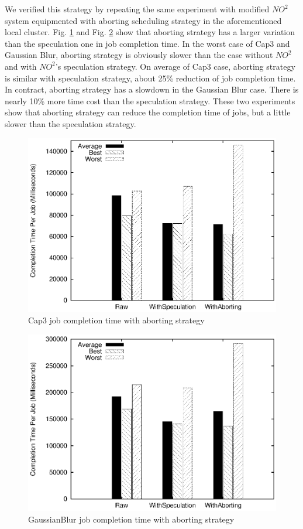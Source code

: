 We verified this strategy by repeating the same experiment with modified $NO^2$ system
equipmented with aborting scheduling strategy in the aforementioned local cluster. Fig.
\ref{figure:abort_completiontime_cap3} and Fig.
\ref{figure:abort_completiontime_gaussianblur} show that aborting strategy has a larger
variation than the speculation one in job completion time. In the worst case of Cap3 and
Gaussian Blur, aborting strategy is obviously slower than the case without $NO^2$ and with
$NO^2$'s speculation strategy. On average of Cap3 case, aborting strategy is similar with
speculation strategy, about 25\% reduction of job completion time. In contract, aborting
strategy has a slowdown in the Gaussian Blur case. There is nearly 10\% more time cost
than the speculation strategy. These two experiments show that aborting strategy can
reduce the completion time of jobs, but a little slower than the speculation strategy.

\begin{figure}
\centering
\includegraphics[width=0.9\columnwidth]{figures/abort_completiontime_cap3.eps}
\caption{Cap3 job completion time with aborting strategy}
\label{figure:abort_completiontime_cap3}
\end{figure}

\begin{figure}
\centering
\includegraphics[width=0.9\columnwidth]{figures/abort_completiontime_gaussianblur.eps}
\caption{GaussianBlur job completion time with aborting strategy}
\label{figure:abort_completiontime_gaussianblur}
\end{figure}

